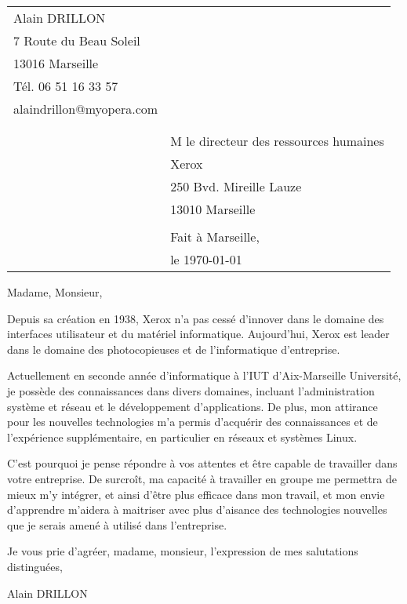 \documentclass[11pt]{article}
\begin{document}
    \thispagestyle{empty}
    \begin{tabular}{p{10cm}p{10cm}}
        Alain DRILLON \\ 
        7 Route du Beau Soleil \\
        13016 Marseille \\
        Tél. 06 51 16 33 57\\
        alaindrillon@myopera.com\\
        & \\ &\\
        & M le directeur des ressources humaines\\
        & Xerox\\
        & 250 Bvd. Mireille Lauze\\
        & 13010 Marseille \\
        & \\
        & Fait à Marseille,\\
        & le \today\\
    \end{tabular}

    \vspace{2cm}

    Madame, Monsieur,
    \vspace{0.75cm}

    Depuis sa création en 1938, Xerox n'a pas cessé d'innover dans le domaine des interfaces utilisateur et du matériel informatique. Aujourd'hui, Xerox est leader dans le domaine des photocopieuses et de l'informatique d'entreprise.

    \vspace{0.75cm}
    Actuellement en seconde année d'informatique à l'IUT d'Aix-Marseille Université, je possède des connaissances dans divers domaines, incluant l'administration système et réseau et le développement d'applications.
    De plus, mon attirance pour les nouvelles technologies m'a permis d’acquérir des connaissances et de l'expérience supplémentaire, en particulier en réseaux et systèmes Linux.
   
   C'est pourquoi je pense répondre à vos attentes et être capable de travailler dans votre entreprise. De surcroît, ma capacité à travailler en groupe me permettra de mieux m'y intégrer, et ainsi d'être plus efficace dans mon travail, et mon envie d'apprendre m'aidera à maitriser avec plus d'aisance des technologies nouvelles que je serais amené à utilisé dans l'entreprise.

   \vspace{0.50cm}
   Je vous prie d'agréer, madame, monsieur, l'expression de mes salutations distinguées,

   \vspace{0.50cm}
   Alain DRILLON
\end{document}
